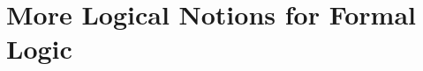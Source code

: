 %
%
%


\section{More Logical Notions for Formal Logic}
\label{sec:other_logical_notions}
\setlength{\parindent}{1em}

